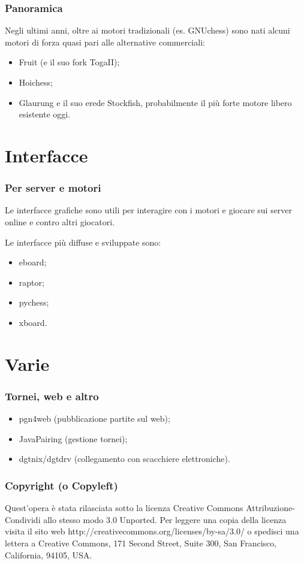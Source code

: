 \documentclass{beamer}
\begin{document}
\begin{frame}\frametitle{Panoramica}

Negli ultimi anni, oltre ai motori tradizionali (es. GNUchess) sono
nati alcuni motori di forza quasi pari alle alternative commerciali:

\begin{itemize}
\item Fruit (e il suo fork TogaII);
\item Hoichess;
\item Glaurung e il suo erede Stockfish, probabilmente il più forte
motore libero esistente oggi.
\end{itemize}

\end{frame}

\section{Interfacce}

\begin{frame}\frametitle{Per server e motori}

Le interfacce grafiche sono utili per interagire con i motori e
giocare sui server online e contro altri giocatori.

Le interfacce più diffuse e sviluppate sono:

\begin{itemize}
\item eboard;
\item raptor;
\item pychess;
\item xboard.
\end{itemize}

\end{frame}

\section{Varie}

\begin{frame}\frametitle{Tornei, web e altro}

\begin{itemize}
\item pgn4web (pubblicazione partite sul web);
\item JavaPairing (gestione tornei);
\item dgtnix/dgtdrv (collegamento con scacchiere elettroniche).
\end{itemize}

\end{frame}

\begin{frame}\frametitle{Copyright (o Copyleft)}
Quest'opera è stata rilasciata sotto la licenza Creative Commons
Attribuzione-Condividi allo stesso modo 3.0 Unported. Per leggere una
copia della licenza visita il sito web
http://creativecommons.org/licenses/by-sa/3.0/ o spedisci una lettera
a Creative Commons, 171 Second Street, Suite 300, San Francisco,
California, 94105, USA.
\end{frame}
\end{document}
